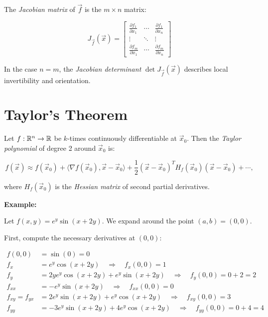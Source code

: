 The \emph{Jacobian matrix} of \( \vec{f} \) is the \( m \times n \) matrix:

\[
    J_{\vec{f}}(\vec{x}) = \begin{bmatrix}
    \frac{\partial f_1}{\partial x_1} & \cdots & \frac{\partial f_1}{\partial x_n} \\
    \vdots & \ddots & \vdots \\
    \frac{\partial f_m}{\partial x_1} & \cdots & \frac{\partial f_m}{\partial x_n}
    \end{bmatrix}
\]

In the case \( n = m \), the \emph{Jacobian determinant} \( \det J_{\vec{f}}(\vec{x}) \) 
describes local invertibility and orientation.

\section{Taylor's Theorem}

Let \( f : \mathbb{R}^n \to \mathbb{R} \) be \(k\)-times continuously differentiable at \( \vec{x}_0 \). Then 
the \emph{Taylor polynomial} of degree 2 around \( \vec{x}_0 \) is:

\[
    f(\vec{x}) \approx f(\vec{x}_0) + \langle \nabla f(\vec{x}_0), \vec{x} - \vec{x}_0 \rangle + 
    \frac{1}{2} {(\vec{x} - \vec{x}_0)}^T H_f(\vec{x}_0)(\vec{x} - \vec{x}_0) + \cdots,
\]

where \( H_f(\vec{x}_0) \) is the \emph{Hessian matrix} of second partial derivatives.

\textbf{Example:} 

Let \( f(x, y) = e^y \sin(x + 2y) \). We expand around the point \( (a, b) = (0, 0) \).

First, compute the necessary derivatives at \( (0, 0) \):

\begin{align*}
    f(0, 0) &= \sin(0) = 0 \\
    f_x &= e^y \cos(x + 2y) \quad \Rightarrow \quad f_x(0, 0) = 1 \\
    f_y &= 2y e^y \cos(x + 2y) + e^y \sin(x + 2y) \quad \Rightarrow \quad f_y(0, 0) = 0 + 2 = 2 \\
    f_{xx} &= -e^y \sin(x + 2y) \quad \Rightarrow \quad f_{xx}(0, 0) = 0 \\
    f_{xy} = f_{yx} &= 2e^y \sin(x + 2y) + e^y \cos(x +2y) \quad \Rightarrow \quad f_{xy}(0, 0) = 3 \\
    f_{yy} &= -3 e^y \sin(x + 2y) + 4e^y \cos(x + 2y) \quad \Rightarrow \quad f_{yy}(0, 0) = 0 + 4 = 4
\end{align*}

